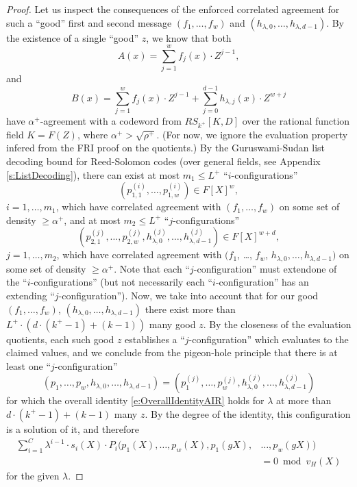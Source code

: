 \documentclass[11pt,article,oneside]{memoir}
\theoremstyle{definition}
\theoremstyle{remark}
\begin{document}
\begin{proof}
Let us inspect the consequences of the enforced correlated agreement for such a “good” first and second message $(f_1,\ldots,f_w)$ and $(h_{\lambda,0},\ldots,h_{\lambda,d-1})$.
By the existence of a single ``good'' $z$, we know that both
\[
A(x)= \sum_{j=1}^w f_j(x)\cdot Z^{j-1},
\]
and
\[
B(x)= \sum_{j=1}^w f_j(x)\cdot Z^{j-1} + \sum_{j=0}^{d-1} h_{\lambda, j}(x) \cdot Z^{w+j}
\] 
have $\alpha^+$-agreement with a codeword from $RS_{k^+}[K,D]$ over the rational function field $K=F(Z)$, where $\alpha^+ > \sqrt{\rho^+}$.
(For now, we ignore the evaluation property infered from the FRI proof on the quotients.)
By the Guruswami-Sudan list decoding bound for Reed-Solomon codes (over general fields, see Appendix \ref{s:ListDecoding}), there can exist at most $m_1\leq L^+$  “$i$-configurations”
\[
 \left(p_{1,1}^{(i)}, \ldots, p_{1,w}^{(i)} \right) \in F[X]^w, 
\]
$i=1,\ldots, m_1$, which have correlated agreement with $(f_1,\ldots, f_w)$ on some set of density $\geq \alpha^+$, 
and at most $m_2 \leq L^+$ ``$j$-configurations''
\[
\left(p_{2,1}^{(j)}, \ldots, p_{2,w}^{(j)}, h_{\lambda,0}^{(j)}, \ldots , h_{\lambda, d-1}^{(j)} \right)\in F[X]^{w+d}, 
\]
$j=1,\ldots,m_2$, which have correlated agreement with $(f_1$, \ldots, $f_w$, $h_{\lambda,0}, \ldots, h_{\lambda, d-1})$ on some set of density $\geq \alpha^+$.
%
Note that each ``$j$-configuration'' must extend\footnotemark one of the ``$i$-configurations'' (but not necessarily each ``$i$-configuration'' has an extending ``$j$-configuration'').
%
%
Now, we take into account that for our good $(f_1,\ldots, f_w)$, $(h_{\lambda,0},\ldots, h_{\lambda, d-1})$ there exist more than $L^+\cdot \left(d\cdot (k^+ - 1) + (k - 1)\right)$ many good $z$. 
By the closeness of the evaluation quotients, each such good $z$ establishes a ``$j$-configuration'' which evaluates to the claimed values, and we conclude from the pigeon-hole principle that there is at least one ``$j$-configuration'' 
\[
(p_1,\ldots, p_w, h_{\lambda, 0}, \ldots, h_{\lambda,d-1}) = \left(p_1^{(j)},\ldots, p_w^{(j)},h_{\lambda,0}^{(j)}, \ldots , h_{\lambda, d-1}^{(j)} \right)
\] 
for which the overall identity \eqref{e:OverallIdentityAIR} holds for $\lambda$ at more than $d\cdot (k^+-1) + (k - 1)$ many $z$. 
By the degree of the identity, this configuration is a solution of it, and therefore
\begin{equation}
\label{e:OverallIdentityAIRmodH}
\begin{aligned}
\sum_{i=1}^{C} \lambda^{i-1}\cdot s_i(X)\cdot P_i(p_1(X), \ldots, p_w(X), p_1(gX),& \ldots, p_w(g X)) 
\\
&= 0 \bmod v_H(X)
\end{aligned}
\end{equation}
for the given $\lambda$.


\end{proof}
\end{document}
